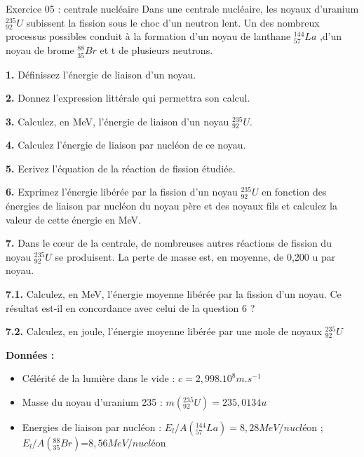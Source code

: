 \documentclass[12pt, french]{article}
\begin{document}
\begin{Box2}{Exercice 05 : centrale nucléaire}
Dans une centrale nucléaire, les noyaux d'uranium $^{235}_{92}U$ subissent la fission sous le choc d'un neutron
lent. Un des nombreux processus possibles conduit à la formation d'un noyau de lanthane $^{144}_{57}La$ ,d'un noyau de brome $^{88}_{35}Br$ et t de plusieurs neutrons.

\textbf{1. } Définissez l'énergie de liaison d'un noyau.

\textbf{2. } Donnez l'expression littérale qui permettra son calcul.

\textbf{3. } Calculez, en MeV, l'énergie de liaison d’un noyau $^{235}_{92}U$.

\textbf{4. } Calculez l’énergie de liaison par nucléon de ce noyau.

\textbf{5. } Ecrivez l’équation de la réaction de fission étudiée.

\textbf{6. } Exprimez l'énergie libérée par la fission d'un noyau $^{235}_{92}U$ en fonction des énergies de liaison par
nucléon du noyau père et des noyaux fils et calculez la valeur de cette énergie en MeV.

\textbf{7. } Dans le cœur de la centrale, de nombreuses autres réactions de fission du noyau $^{235}_{92}U$ se produisent. La perte de masse est, en moyenne, de 0,200 u par noyau.

\textbf{7.1. } Calculez, en MeV, l'énergie moyenne libérée par la fission d’un noyau. Ce résultat est-il en concordance avec celui de la question 6 ?

\textbf{7.2. }Calculez, en joule, l'énergie moyenne libérée par une mole de noyaux $^{235}_{92}U$

\textbf{Données :}
\begin{itemize}
	\item Célérité de la lumière dans le vide : $c = 2,998 . 10^8 m.s^{-1}$  
	\item Masse du noyau d’uranium 235 : $m( ^{235}_{92}U) = 235,0134u$ 

	\item Energies de liaison par nucléon : $E_l/A(^{144}_{57}La) = 8,28MeV/nucl$éon  ; $E_l/A(^{88}_{35}Br)$=$8,56MeV/nucl$éon
\end{itemize}
\end{Box2}
\end{document}
